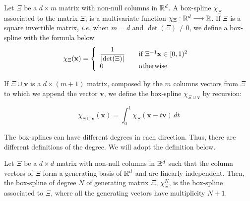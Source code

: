 \documentclass[proc]{edpsmath}
\begin{document}
\begin{dfntn}

	Let $\Xi$ be a $d \times m$ matrix with non-null columns in  $\mathbb{R}^d$. A box-spline $\chi_\Xi$ associated to the matrix $\Xi$, is a multivariate function $\chi_\Xi : \mathbb{R}^d \longrightarrow \mathbb{R}$. If $\Xi$ is a square invertible matrix, \emph{i.e.} when $m = d$ and $\det(\Xi) \neq 0$, we define a box-spline with the formula below
	\begin{equation}
		\chi_{\Xi} (\mathbf{x}) = \left\{
  		\begin{array}{l l}
    		\dfrac{1}{\lvert \det(\Xi)\rvert} & \quad \text{if $\Xi^{-1}\mathbf{x} \in [0,1)^2$ }\\
    		0 & \quad \text{otherwise}
  		\end{array} \right.
	\end{equation}

	If $\Xi \cup \mathbf{v}$ is a $d \times (m + 1)$ matrix, composed by the $m$ columns vectors from $\Xi$ to which we append the vector $\mathbf{v}$, we define the box-spline $\chi_{\Xi \cup \mathbf{v}}$ by recursion:

	\begin{equation} 
	\label{eqn:boxsplines_basis}
		\chi_{\Xi \cup \mathbf{v}}(\mathbf{x}) = \int_0^ 1 \chi_\Xi(\mathbf{x}-t\mathbf{v}) \, dt
	\end{equation}

\end{dfntn}

\rmrk The box-splines can have different degrees in each direction. Thus, there are different definitions of the degree. We will adopt the definition below.

\begin{dfntn}
Let $\Xi$ be a $d \times d$ matrix with non-null columns in $\mathbb{R}^d$ such that the column vectors of $\Xi$ form a generating basis of $\mathbb{R}^d$ and are linearly independent. Then, the box-spline of degree $N$ of generating matrix $\Xi$, $\chi^N_\Xi$, is the box-spline associated to $\Xi$, where all the generating vectors have multiplicity $N+1$. %


\end{dfntn}
\end{document}
